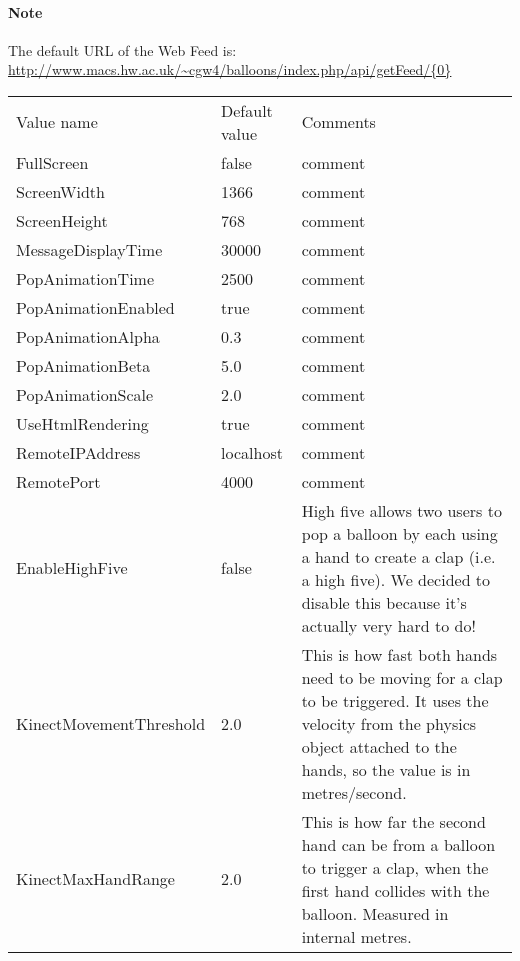 \paragraph{Note}

The default URL of the Web Feed is:\\ \url{http://www.macs.hw.ac.uk/~cgw4/balloons/index.php/api/getFeed/{0}}

\clearpage{}

\begin{tabular}{|>{\raggedright}p{5cm}|>{\raggedright}p{3.6cm}|>{\raggedright}p{7cm}|}

\hline
\multicolumn{3}{|c|}{Client specific values}\tabularnewline
\hline

Value name & Default value & Comments \tabularnewline
\hline

FullScreen & false & comment
\tabularnewline\hline

ScreenWidth & 1366 & comment
\tabularnewline\hline

ScreenHeight & 768 & comment
\tabularnewline\hline

MessageDisplayTime & 30000 & comment
\tabularnewline\hline

PopAnimationTime & 2500 & comment
\tabularnewline\hline

PopAnimationEnabled & true & comment
\tabularnewline\hline

PopAnimationAlpha & 0.3 & comment
\tabularnewline\hline

PopAnimationBeta & 5.0 & comment
\tabularnewline\hline

PopAnimationScale & 2.0 & comment
\tabularnewline\hline

UseHtmlRendering & true & comment
\tabularnewline\hline

RemoteIPAddress & localhost & comment
\tabularnewline\hline

RemotePort & 4000 & comment
\tabularnewline\hline

EnableHighFive & false & High five allows two users to pop a balloon by each using a hand to create a clap (i.e. a high five). We decided to disable this because it's actually very hard to do!
\tabularnewline\hline

KinectMovementThreshold & 2.0 & This is how fast both hands need to be moving for a clap to be triggered. It uses the velocity from the physics object attached to the hands, so the value is in metres/second.
\tabularnewline\hline

KinectMaxHandRange & 2.0 & This is how far the second hand can be from a balloon to trigger a clap, when the first hand collides with the balloon. Measured in internal metres.
\tabularnewline\hline


\end{tabular}
